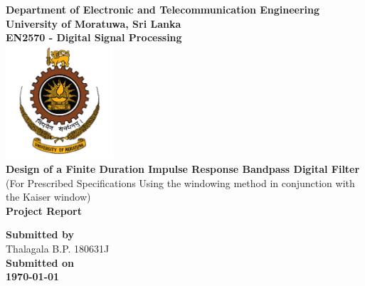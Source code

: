 \begin{titlepage}
\center %

\textbf{\large Department of Electronic and Telecommunication Engineering}\\[0.5cm]
\textbf{\Large University of Moratuwa, Sri Lanka}\\[1cm]
\textbf{\large EN2570 - Digital Signal Processing}\\[2cm]
\includegraphics[width=0.3\textwidth]{figures/uomlogo}\\[2cm]

	
\textbf{\Huge Design of a Finite Duration Impulse Response Bandpass Digital Filter }\\[0.2cm]
{\Large (For Prescribed Specifications Using the windowing method in conjunction with the Kaiser window)}\\[0.5cm]
\textbf{\Large Project Report}\\[5cm]




\vfill

\textbf{\large Submitted by}\\[0.5cm]

{\large Thalagala B.P.}	\hspace{5mm} {\large 180631J }\\[1cm]


\textbf{\large Submitted on}\\[0.5cm]
\textbf{\Large \today} %


\vfill %

\end{titlepage}